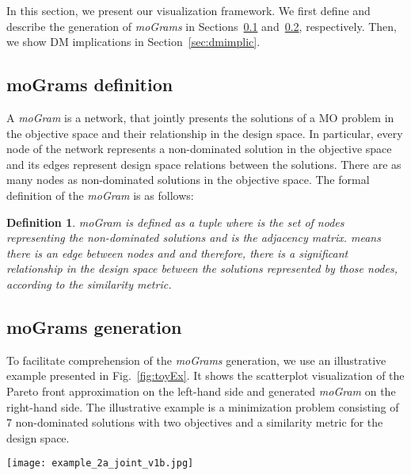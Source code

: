 \documentclass[journal]{IEEEtran}
\newtheorem*{mydef}{Definition}
\begin{document}
In this section, we present our visualization framework. We first define and describe the generation of \emph{moGrams} in Sections~\ref{sec:mogramsDef} and~\ref{sec:mogramsGen}, respectively. Then, we show DM implications in Section~\ref{sec:dmimplic}.

\subsection{moGrams definition}
\label{sec:mogramsDef}

A \emph{moGram} is a network, that jointly presents the solutions of a MO problem in the objective space and their relationship in the design space. In particular, every node of the network represents a non-dominated solution in the objective space and its edges represent design space relations between the solutions. There are as many nodes as non-dominated solutions in the objective space. The formal definition of the \emph{moGram} is as follows:

\begin{mydef}
 moGram \emph{is defined as a tuple}  \emph{where}  \emph{is the set of nodes representing the  non-dominated solutions and}  \emph{is the adjacency matrix.}  \emph{means there is an edge between nodes  and  and therefore, there is a significant relationship in the design space between the solutions represented by those nodes, according to the similarity metric.}
\end{mydef}



\subsection{moGrams generation}
\label{sec:mogramsGen}






To facilitate comprehension of the \emph{moGrams} generation, we use an illustrative example presented in Fig.~\ref{fig:toyEx}. It shows the scatterplot visualization of the Pareto front approximation on the left-hand side and generated \emph{moGram} on the right-hand side. The illustrative example is a minimization problem consisting of 7 non-dominated solutions with two objectives and a similarity metric for the design space. 


\begin{figure*}[htb!]
\begin{center}
\texttt{[image: example\_2a\_joint\_v1b.jpg]}
\caption{A Pareto front approximation (on the left) and the corresponding \emph{moGram} (on the right) for a toy example.}
\label{fig:toyEx}
\end{center}
\end{figure*}
\end{document}
